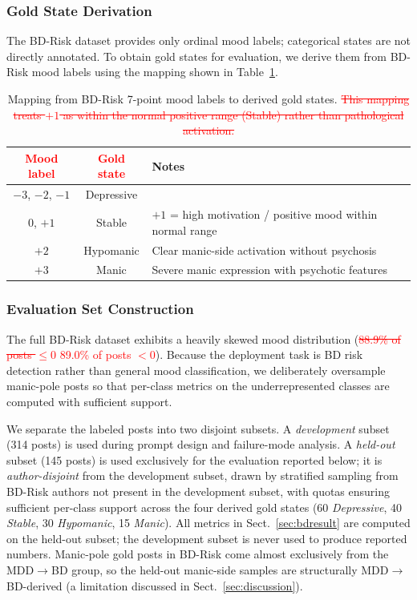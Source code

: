 \documentclass[runningheads]{llncs}
\newcommand{\rev}[1]{\textcolor{red}{#1}}
\newcommand{\del}[1]{\textcolor{red}{\sout{#1}}}
\newcommand{\rev}[1]{#1}
\newcommand{\del}[1]{}
\begin{document}
\subsubsection{Gold State Derivation}
The BD-Risk dataset provides only ordinal mood labels; categorical states are not directly annotated. To obtain gold states for evaluation, we derive them from BD-Risk mood labels using the mapping shown in Table~\ref{tab:mapping}.

\begin{table}[t]
\caption{Mapping from BD-Risk 7-point mood labels to derived gold states.\del{ This mapping treats $+1$ as within the normal positive range (Stable) rather than pathological activation.}}
\label{tab:mapping}
\centering
\begin{tabular}{ccp{5.2cm}}
\toprule
\rev{\textbf{Mood label}} & \rev{\textbf{Gold state}} & \textbf{Notes} \\
\midrule
$-3$, $-2$, $-1$ & Depressive & \\
0, $+1$ & Stable & $+1$ = high motivation / positive mood within normal range \\
$+2$ & Hypomanic & Clear manic-side activation without psychosis \\
$+3$ & Manic & Severe manic expression with psychotic features \\
\bottomrule
\end{tabular}
\end{table}

\subsubsection{Evaluation Set Construction}
The full BD-Risk dataset exhibits a heavily skewed mood distribution (\del{88.9\% of posts $\leq 0$ }\rev{89.0\% of posts $< 0$}). Because the deployment task is BD risk detection rather than general mood classification, we deliberately oversample manic-pole posts so that per-class metrics on the underrepresented classes are computed with sufficient support.

We separate the labeled posts into two disjoint subsets. A \emph{development} subset (314 posts) is used during prompt design and failure-mode analysis. A \emph{held-out} subset (145 posts) is used exclusively for the evaluation reported below; it is \emph{author-disjoint} from the development subset, drawn by stratified sampling from BD-Risk authors not present in the development subset, with quotas ensuring sufficient per-class support across the four derived gold states (60 \emph{Depressive}, 40 \emph{Stable}, 30 \emph{Hypomanic}, 15 \emph{Manic}). All metrics in Sect.~\ref{sec:bdresult} are computed on the held-out subset; the development subset is never used to produce reported numbers. Manic-pole gold posts in BD-Risk come almost exclusively from the MDD$\rightarrow$BD group, so the held-out manic-side samples are structurally MDD$\rightarrow$BD-derived (a limitation discussed in Sect.~\ref{sec:discussion}).
\end{document}
